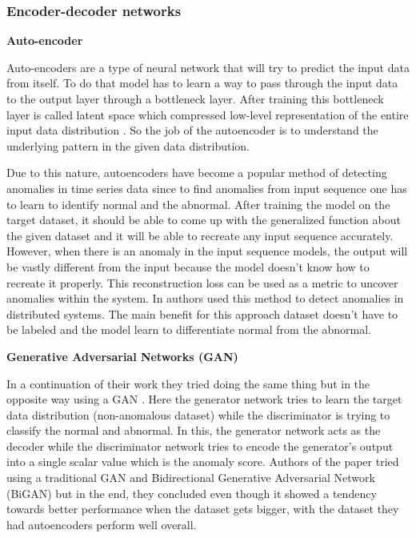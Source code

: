 \subsubsection{Encoder-decoder networks}

\textbf{Auto-encoder}

\noindent Auto-encoders are a type of neural network that will try to predict the input data from itself. To do that model has to learn a way to pass through the input data to the output layer through a bottleneck layer. After training this bottleneck layer is called latent space which compressed low-level representation of the entire input data distribution \citep{hinton2006reducing}. So the job of the autoencoder is to understand the underlying pattern in the given data distribution.

Due to this nature, autoencoders have become a popular method of detecting anomalies in time series data since to find anomalies from input sequence one has to learn to identify normal and the abnormal. After training the model on the target dataset, it should be able to come up with the generalized function about the given dataset and it will be able to recreate any input sequence accurately. However, when there is an anomaly in the input sequence models, the output will be vastly different from the input because the model doesn't know how to recreate it properly. This reconstruction loss can be used as a metric to uncover anomalies within the system. In \cite{kumarage2018anomaly} authors used this method to detect anomalies in distributed systems. The main benefit for this approach dataset doesn't have to be labeled and the model learn to differentiate normal from the abnormal.


\noindent \textbf{Generative Adversarial Networks (GAN)}

\noindent In a continuation of their work \cite{kumarage2019generative} they tried doing the same thing but in the opposite way using a GAN \citep{goodfellow2014generative}. Here the generator network tries to learn the target data distribution (non-anomalous dataset) while the discriminator is trying to classify the normal and abnormal. In this, the generator network acts as the decoder while the discriminator network tries to encode the generator's output into a single scalar value which is the anomaly score. Authors of the paper tried using a traditional GAN and Bidirectional Generative Adversarial Network (BiGAN) \citep{donahue2016adversarial} but in the end, they concluded even though it showed a tendency towards better performance when the dataset gets bigger, with the dataset they had autoencoders perform well overall.

